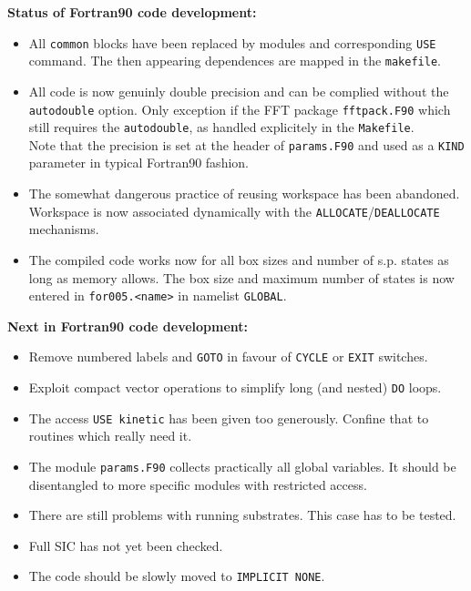 \documentclass[12pt]{article}
\begin{document}
{\Large\bf Status of Fortran90 code development:}
\begin{itemize}
  \item 
    All {\tt common} blocks have been replaced by modules
    and corresponding {\tt USE} command. The then appearing
    dependences are mapped in the {\tt makefile}.
  \item
    All code is now genuinly double precision and can be
    complied without the {\tt autodouble} option. Only exception
    if the FFT package {\tt fftpack.F90} which still requires
    the  {\tt autodouble}, as handled explicitely in the
    {\tt Makefile}.
    \\
    Note that the precision is set at the header of {\tt params.F90}
    and used as a {\tt KIND} parameter in typical Fortran90 fashion.
  \item
    The somewhat dangerous practice of reusing workspace has been
    abandoned. Workspace is now associated dynamically with
    the {\tt ALLOCATE}/{\tt DEALLOCATE} mechanisms.
  \item
    The compiled code works now for all box sizes and number of s.p.
    states as long as memory allows. The box size and maximum number
    of states is now entered in {\tt for005.<name>} in namelist
    {\tt GLOBAL}.
\end{itemize}

{\Large\bf Next in Fortran90 code development:}
\begin{itemize}
  \item Remove numbered labels and {\tt GOTO} in favour of
        {\tt CYCLE} or {\tt EXIT} switches.
  \item Exploit compact vector operations to simplify
        long (and nested) {\tt DO} loops.
  \item The access {\tt USE kinetic} has been given too generously.
        Confine that to routines which really need it.
  \item The module {\tt params.F90} collects practically all
        global variables. It should be disentangled to more
        specific modules with restricted access. 
  \item There are still problems with running substrates.
        This case has to be tested.
  \item Full SIC has not yet been checked.
  \item The code should be slowly moved to {\tt IMPLICIT NONE}.
\end{itemize}

\newpage
\end{document}
